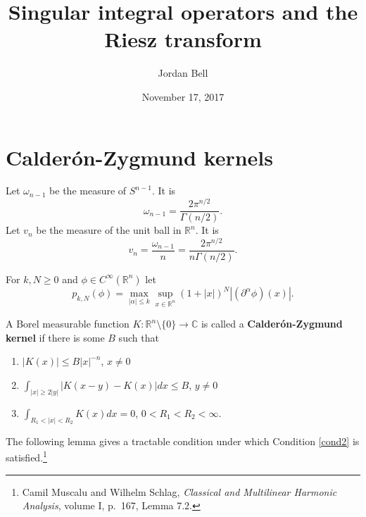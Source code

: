 \documentclass{article}
\theoremstyle{definition}
\begin{document}
\title{Singular integral operators and the Riesz transform}
\author{Jordan Bell}
\date{November 17, 2017}

\maketitle

\section{Calder\'on-Zygmund kernels}
Let $\omega_{n-1}$ be the measure of $S^{n-1}$. It is 
\[
\omega_{n-1} = \frac{2\pi^{n/2}}{\Gamma(n/2)}.
\]
Let $v_n$ be the measure
of the unit ball in $\mathbb{R}^n$. It is
\[
v_n = \frac{\omega_{n-1}}{n} = \frac{2\pi^{n/2}}{n\Gamma(n/2)}.
\]

For $k,N \geq 0$ and $\phi \in C^\infty(\mathbb{R}^n)$ let
\[
p_{k,N}(\phi) = \max_{|\alpha| \leq k} \sup_{x \in \mathbb{R}^n} 
(1+|x|)^{N} |(\partial^\alpha \phi)(x)|.
\]
 

A Borel measurable function $K:\mathbb{R}^n \setminus \{0\} \to \mathbb{C}$ is called a 
\textbf{Calder\'on-Zygmund kernel} if there is some $B$ such that
\begin{enumerate}
\item $|K(x)| \leq B|x|^{-n}$, $x \neq 0$ \label{cond1}
\item $\int_{|x| \geq 2|y|} |K(x-y)-K(x)| dx \leq B$, $y \neq 0$ \label{cond2}
\item $\int_{R_1<|x|<R_2} K(x) dx = 0$, $0<R_1<R_2<\infty$. \label{cond3}
\end{enumerate}

The following lemma gives a tractable condition under which 
Condition \ref{cond2} is satisfied.\footnote{Camil Muscalu and Wilhelm Schlag, {\em Classical
and Multilinear Harmonic Analysis}, volume I, p.~167, Lemma 7.2.}
\end{document}
